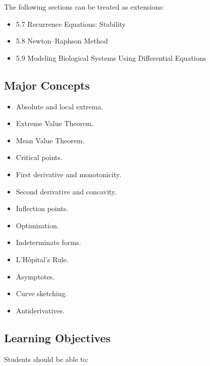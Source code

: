 \documentclass[11pt]{article}
\begin{document}
The following sections can be treated as extensions:

\begin{itemize}
    \item 5.7 Recurrence Equations: Stability
    \item 5.8 Newton--Raphson Method
    \item 5.9 Modeling Biological Systems Using Differential Equations
\end{itemize}

\subsection{Major Concepts}

\begin{itemize}
    \item Absolute and local extrema.
    \item Extreme Value Theorem.
    \item Mean Value Theorem.
    \item Critical points.
    \item First derivative and monotonicity.
    \item Second derivative and concavity.
    \item Inflection points.
    \item Optimization.
    \item Indeterminate forms.
    \item L'H\^opital's Rule.
    \item Asymptotes.
    \item Curve sketching.
    \item Antiderivatives.
\end{itemize}

\subsection{Learning Objectives}

Students should be able to:
\end{document}
